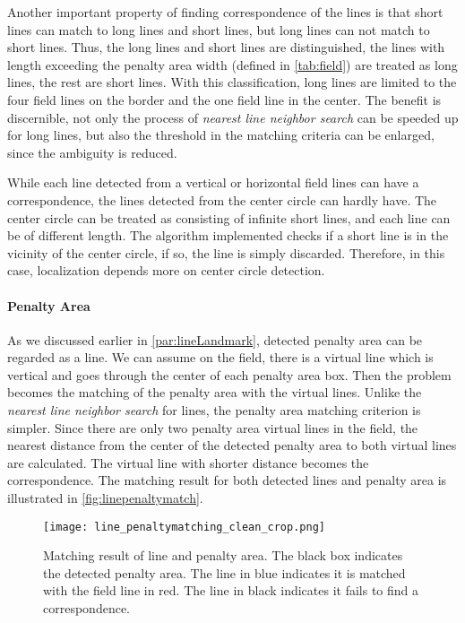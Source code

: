 Another important property of finding correspondence of the lines is that short lines can match to long lines and short lines, but long lines can not match to short lines. Thus, the long lines and short lines are distinguished, the lines with length exceeding the penalty area width (defined in \autoref{tab:field}) are treated as long lines, the rest are short lines. With this classification, long lines are limited to the four field lines on the border and the one field line in the center. The benefit is discernible, not only the process of \textit{nearest line neighbor search} can be speeded up for long lines, but also the threshold in the matching criteria can be enlarged, since the ambiguity is reduced. 

While each line detected from a vertical or horizontal field lines can have a correspondence, the lines detected from the center circle can hardly have. The center circle can be treated as consisting of infinite short lines, and each line can be of different length. The algorithm implemented checks if a short line is in the vicinity of the center circle, if so, the line is simply discarded. Therefore, in this case, localization depends more on center circle detection.




\paragraph{Penalty Area}
As we discussed earlier in \autoref{par:lineLandmark}, detected penalty area can be regarded as a line. We can assume on the field, there is a virtual line which is vertical and goes through the center of each penalty area box. Then the problem becomes the matching of the penalty area with the virtual lines. Unlike the \textit{nearest line neighbor search} for lines, the penalty area matching criterion is simpler. Since there are only two penalty area virtual lines in the field, the nearest distance from the center of the detected penalty area to both virtual lines are calculated. The virtual line with shorter distance becomes the correspondence. The matching result for both detected lines and penalty area is illustrated in \autoref{fig:linepenaltymatch}.

\begin{figure}[h]
\begin{center}
  \texttt{[image: line\_penaltymatching\_clean\_crop.png]}
\end{center}
\caption[Matching result of line and penalty area.]{Matching result of line and penalty area. The black box indicates the detected penalty area. The line in blue indicates it is matched with the field line in red. The line in black indicates it fails to find a correspondence.}
\label{fig:linepenaltymatch}
\end{figure}





